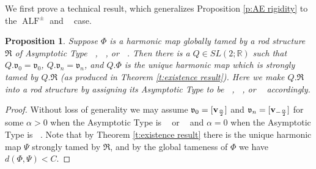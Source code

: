 \documentclass[a4paper,11pt]{amsart}
\newtheorem{proposition}[theorem]{Proposition}
\theoremstyle{definition}
\numberwithin{equation}{section}
\newcommand{\R}{\mathbb{R}}
\newcommand{\mv} {\mathfrak v}
\newcommand{\mR} {\mathfrak R}
\DeclareMathOperator{\bv}{{\bf v}}
\DeclareMathOperator{\ALF}{ALF}
\DeclareMathOperator{\ALFp}{ALF^+}
\DeclareMathOperator{\ALFm}{ALF^{--}}
\DeclareMathOperator{\AFa}{AF_\beta}
\begin{document}
    
    We first prove a technical result, which generalizes Proposition \ref{p:AE rigidity} to the  $\ALF^{\pm}$ and $\AFa$ case. 
\begin{proposition} \label{p:ALF/AF rigidity}
    Suppose $\Phi$ is a harmonic map globally tamed by a rod structure $\mR$ of  Asymptotic Type  $\ALFm$, $\ALFp$, or $\AFa$. Then there is a $Q\in SL(2; \R)$ such that $Q.\mv_0=\mv_0$, $Q.\mv_n=\mv_n$, and $Q.\Phi$ is the unique harmonic map which is strongly tamed by $Q.\mR$ (as produced in Theorem \ref{t:existence result}). Here we make $Q.\mR$ into a rod structure by assigning its Asymptotic Type to be $\ALFm$, $\ALFp$, or $\AFa$ accordingly.
\end{proposition}
\begin{proof}
    Without loss of generality we may assume $\mv_0=[\bv_{\frac{\alpha}{2}}]$ and $\mv_n=[\bv_{-\frac{\alpha}{2}}]$ for some $\alpha>0$ when the Asymptotic Type is $\ALFm$ or $\ALFp$ and $\alpha=0$ when the Asymptotic Type is $\AFa$. Note that by Theorem \ref{t:existence result} there is the unique harmonic map $\Psi$ strongly tamed by $\mR$, and by the global tameness of $\Phi$ we have $d(\Phi,\Psi)<C$. 


\end{proof}
\end{document}
